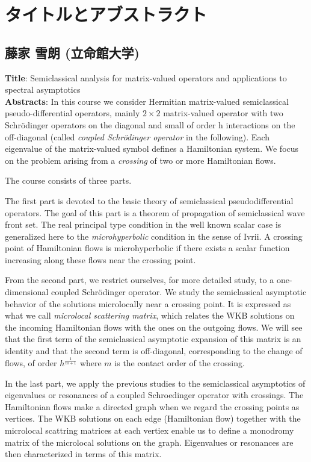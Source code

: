\documentclass[a4paper,11pt]{article}
\numberwithin{equation}{section}
\begin{document}
\newpage

\section*{タイトルとアブストラクト}

\subsection*{\textbf{藤家 雪朗}  (立命館大学)}
\textbf{Title}: Semiclassical analysis for matrix-valued operators
and applications to spectral asymptotics\\
\textbf{Abstracts}: In this course we consider Hermitian matrix-valued semiclassical pseudo-differential operators, mainly $2\times 2$ matrix-valued operator with two Schr\"odinger operators on the diagonal and small of order h interactions on the off-diagonal (called {\it coupled Schr\"odinger operator} in the following). Each eigenvalue of the matrix-valued symbol defines a Hamiltonian system. We focus on the problem arising from a {\it crossing} of two or more Hamiltonian flows.

The course consists of three parts.

The first part is devoted to the basic theory of semiclassical
pseudodifferential operators. The goal of this part is a theorem of propagation of semiclassical wave front set. The real principal type condition in the well known scalar case is generalized here to the {\it microhyperbolic} condition in the sense of Ivrii.
A crossing point of Hamiltonian flows is microhyperbolic if there exists a scalar function increasing along these flows near the crossing point.

From the second part, we restrict ourselves, for more detailed study, 
to a one-dimensional coupled Schr\"odinger operator. We study the semiclassical asymptotic behavior of the solutions microlocally near a crossing point. It is expressed as what we call {\it microlocal scattering
matrix}, which relates the WKB solutions on the incoming Hamiltonian flows
with the ones on the outgoing flows. We will see that the first term of the semiclassical asymptotic expansion of this matrix is an identity and that the second term is off-diagonal, corresponding to the change of flows, of order $h^{\frac 1{m+1}}$ where $m$ is the contact order of the crossing.

In the last part, we apply the previous studies to the semiclassical
asymptotics of eigenvalues or resonances of a coupled Schroedinger operator with crossings. The Hamiltonian flows make a directed graph 
when we regard the crossing points as vertices. The WKB solutions on each edge (Hamiltonian flow) together with the microlocal scattring matrices at each vertiex enable us to define a monodromy matrix of the microlocal solutions on the graph.
Eigenvalues or resonances are then characterized in terms of this matrix.
\end{document}
